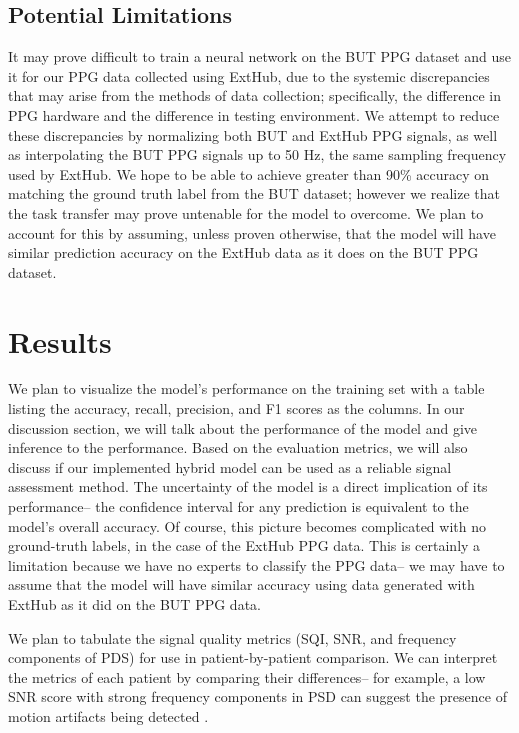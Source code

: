 \documentclass[letterpaper, 10 pt, conference]{ieeeconf}  %
\begin{document}
\subsection{Potential Limitations}
It may prove difficult to train a neural network on the BUT PPG dataset and use it for our PPG data collected using ExtHub, due to the systemic discrepancies that may arise from the methods of data collection; specifically, the difference in PPG hardware and the difference in testing environment. We attempt to reduce these discrepancies by normalizing both BUT and ExtHub PPG signals, as well as interpolating the BUT PPG signals up to 50 Hz, the same sampling frequency used by ExtHub. We hope to be able to achieve greater than 90\% accuracy on matching the ground truth label from the BUT dataset; however we realize that the task transfer may prove untenable for the model to overcome. We plan to account for this by assuming, unless proven otherwise, that the model will have similar prediction accuracy on the ExtHub data as it does on the BUT PPG dataset. 




\section{Results}
We plan to visualize the model’s performance on the training set with a table listing the accuracy, recall, precision, and F1 scores as the columns. In our discussion section, we will talk about the performance of the model and give inference to the performance. Based on the evaluation metrics, we will also discuss if our implemented hybrid model can be used as a reliable signal assessment method. The uncertainty of the model is a direct implication of its performance– the confidence interval for any prediction is equivalent to the model’s overall accuracy. Of course, this picture becomes complicated with no ground-truth labels, in the case of the ExtHub PPG data. This is certainly a limitation because we have no experts to classify the PPG data– we may have to assume that the model will have similar accuracy using data generated with ExtHub as it did on the BUT PPG data. 

We plan to tabulate the signal quality metrics (SQI, SNR, and frequency components of PDS) for use in patient-by-patient comparison. We can interpret the metrics of each patient by comparing their differences– for example, a low SNR score with strong frequency components in PSD can suggest the presence of motion artifacts being detected \cite{lee_motion_2020}. 
\end{document}
